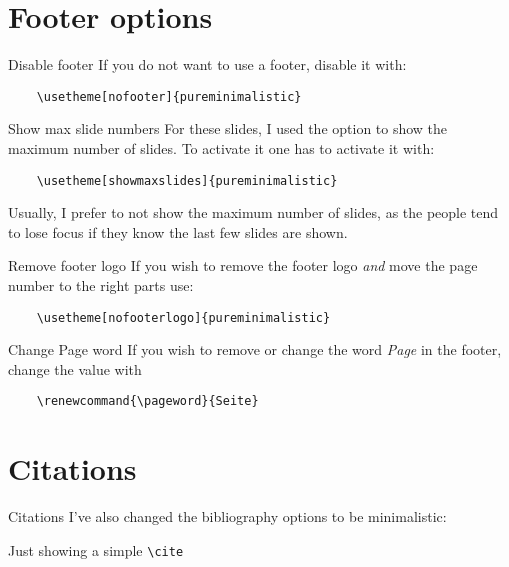 \documentclass[aspectratio=169]{beamer}                    %
\renewcommand{\pageword}{Página}
\begin{document}
\section{Footer options}
\begin{frame}[fragile]{Disable footer}
	If you do not want to use a footer, disable it with:
	\begin{verbatim}
    \usetheme[nofooter]{pureminimalistic}
  \end{verbatim}
\end{frame}

\begin{frame}[fragile]{Show max slide numbers}
	For these slides, I used the option to
	show the maximum number of slides. To activate it
	one has to activate it with:
	\begin{verbatim}
    \usetheme[showmaxslides]{pureminimalistic}
  \end{verbatim}
	Usually, I prefer to not show the maximum number of
	slides, as the people tend to lose focus if they know
	the last few slides are shown.
\end{frame}

\begin{frame}[fragile]{Remove footer logo}
	If you wish to remove the footer logo \emph{and}
	move the page number to the right parts use:
	\begin{verbatim}
    \usetheme[nofooterlogo]{pureminimalistic}
  \end{verbatim}
\end{frame}

\begin{frame}[fragile]{Change Page word}
	If you wish to remove or change the word \emph{Page}
	in the footer, change the value with
	\begin{verbatim}
    \renewcommand{\pageword}{Seite}
  \end{verbatim}
\end{frame}

\section{Citations}
\begin{frame}{Citations}
	I've also changed the bibliography options to be minimalistic:

	Just showing a simple \texttt{\textbackslash{}cite} \cite{AlexNet}
	\vfill
	\printbibliography
\end{frame}

\appendix %
\end{document}
